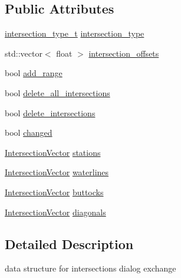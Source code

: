 \subsection*{Public Attributes}
\begin{DoxyCompactItemize}
\item 
\hyperlink{namespaceShipCAD_aa56834b730aafdf2786ddc9a60a046fd}{intersection\+\_\+type\+\_\+t} \hyperlink{structShipCAD_1_1IntersectionsDialogData_a45fdbb695bb58187c24037aba1eabca6}{intersection\+\_\+type}
\item 
std\+::vector$<$ float $>$ \hyperlink{structShipCAD_1_1IntersectionsDialogData_ac2a5677d64845ff41b99f05f590170f8}{intersection\+\_\+offsets}
\item 
bool \hyperlink{structShipCAD_1_1IntersectionsDialogData_a07f300ae3f6ec124a932ac88d7380194}{add\+\_\+range}
\item 
bool \hyperlink{structShipCAD_1_1IntersectionsDialogData_ae423b73a2c8644594ac4c7f56125af9f}{delete\+\_\+all\+\_\+intersections}
\item 
bool \hyperlink{structShipCAD_1_1IntersectionsDialogData_a0b612a856d1875fb0062907fb1cc77a7}{delete\+\_\+intersections}
\item 
bool \hyperlink{structShipCAD_1_1IntersectionsDialogData_a3f9b8b74cdacaed5cfdf2026dfaf2d75}{changed}
\item 
\hyperlink{namespaceShipCAD_a9910f0963197f9df6125398efd4fa139}{Intersection\+Vector} \hyperlink{structShipCAD_1_1IntersectionsDialogData_a15b25bd4167a7eb4bc24240f98ec83ad}{stations}
\item 
\hyperlink{namespaceShipCAD_a9910f0963197f9df6125398efd4fa139}{Intersection\+Vector} \hyperlink{structShipCAD_1_1IntersectionsDialogData_a239c93bd2e10930a0b73fa4a491b3332}{waterlines}
\item 
\hyperlink{namespaceShipCAD_a9910f0963197f9df6125398efd4fa139}{Intersection\+Vector} \hyperlink{structShipCAD_1_1IntersectionsDialogData_a42e8714909a6cb3f20d4508e3ed3d7cd}{buttocks}
\item 
\hyperlink{namespaceShipCAD_a9910f0963197f9df6125398efd4fa139}{Intersection\+Vector} \hyperlink{structShipCAD_1_1IntersectionsDialogData_aa646939995a2b52262724964a6e1fd47}{diagonals}
\end{DoxyCompactItemize}


\subsection{Detailed Description}
data structure for intersections dialog exchange 

